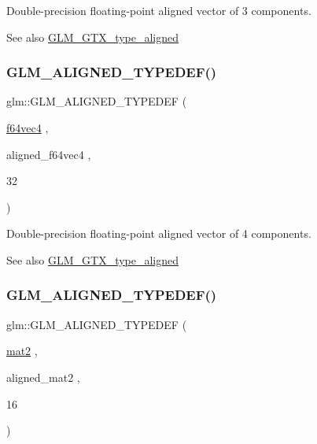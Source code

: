 Double-\/precision floating-\/point aligned vector of 3 components. \begin{DoxySeeAlso}{See also}
\mbox{\hyperlink{group__gtx__type__aligned}{G\+L\+M\+\_\+\+G\+T\+X\+\_\+type\+\_\+aligned}} 
\end{DoxySeeAlso}
\mbox{\label{group__gtx__type__aligned_ga804c654cead1139bd250f90f9bb01fad}} 
\subsubsection{\texorpdfstring{GLM\_ALIGNED\_TYPEDEF()}{GLM\_ALIGNED\_TYPEDEF()}\hspace{0.1cm}{\footnotesize\ttfamily [162/209]}}
{\footnotesize\ttfamily glm\+::\+G\+L\+M\+\_\+\+A\+L\+I\+G\+N\+E\+D\+\_\+\+T\+Y\+P\+E\+D\+EF (\begin{DoxyParamCaption}\item[{\mbox{\hyperlink{group__gtc__type__precision_ga9d896f484039b22873e7bfb9e06f7b47}{f64vec4}}}]{,  }\item[{aligned\+\_\+f64vec4}]{,  }\item[{32}]{ }\end{DoxyParamCaption})}

Double-\/precision floating-\/point aligned vector of 4 components. \begin{DoxySeeAlso}{See also}
\mbox{\hyperlink{group__gtx__type__aligned}{G\+L\+M\+\_\+\+G\+T\+X\+\_\+type\+\_\+aligned}} 
\end{DoxySeeAlso}
\mbox{\label{group__gtx__type__aligned_gafed7d010235a3aa7ea2f88646858f2ae}} 
\subsubsection{\texorpdfstring{GLM\_ALIGNED\_TYPEDEF()}{GLM\_ALIGNED\_TYPEDEF()}\hspace{0.1cm}{\footnotesize\ttfamily [163/209]}}
{\footnotesize\ttfamily glm\+::\+G\+L\+M\+\_\+\+A\+L\+I\+G\+N\+E\+D\+\_\+\+T\+Y\+P\+E\+D\+EF (\begin{DoxyParamCaption}\item[{\mbox{\hyperlink{group__core__types_ga8357ec0aab6f8cf69313592492663c3f}{mat2}}}]{,  }\item[{aligned\+\_\+mat2}]{,  }\item[{16}]{ }\end{DoxyParamCaption})}

